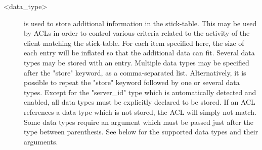 \begin{description}
   \item[<data\_type>] is used to store additional information in the stick-table. This
               may be used by ACLs in order to control various criteria related
               to the activity of the client matching the stick-table. For each
               item specified here, the size of each entry will be inflated so
               that the additional data can fit. Several data types may be
               stored with an entry. Multiple data types may be specified after
               the "store" keyword, as a comma-separated list. Alternatively,
               it is possible to repeat the "store" keyword followed by one or
               several data types. Except for the "server\_id" type which is
               automatically detected and enabled, all data types must be
               explicitly declared to be stored. If an ACL references a data
               type which is not stored, the ACL will simply not match. Some
               data types require an argument which must be passed just after
               the type between parenthesis. See below for the supported data
               types and their arguments.
  \end{description}

